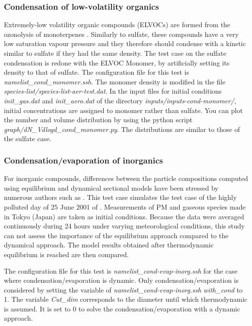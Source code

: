\documentclass[a4paper,11pt]{article}
\begin{document}
\subsubsection{Condensation of low-volatility organics}

Extremely-low volatility organic compounds (ELVOCs) are formed from the ozonolysis of monoterpenes \cite{chrit2017} .
Similarly to sulfate, these compounds have a very low saturation vapour pressure and they therefore should condense with a kinetic similar to sulfate if they had the same density.
The test case on the sulfate condensation is redone with the ELVOC Monomer, by artificially setting its density to that of sulfate.
The configuration file for this test is {\it{namelist\_cond\_monomer.ssh}}.
The monomer density is modified in the file {\it{species-list/species-list-aer-test.dat}}.
In the input files for initial conditions {\it{init\_gas.dat}} and {\it{init\_aero.dat}} of the directory {\it{inputs/inputs-cond-monomer/}}, initial concentrations are assigned to monomer rather than sulfate. You can plot the number and volume distribution by using the python script {\it{graph/dN\_Vdlogd\_cond\_monomer.py}}. 
The distributions are similar to those of the sulfate case.

\subsubsection{Condensation/evaporation of inorganics}
For inorganic compounds, differences between the particle compositions computed using equilibrium and dynamical sectional models have been stressed by numerous authors such as \cite{sartelet2006}. This test case simulates the test case of the highly polluted day of 25 June 2001 of \cite{sartelet2006} .
Measurements of PM and gaseous species made in Tokyo (Japan) are taken as initial conditions. Because the data were averaged continuously during 24 hours under varying meteorological conditions, this study can not assess the importance of the equilibrium approach compared to the dynamical approach. The model results obtained after thermodynamic equilibrium is reached are then compared.

The configuration file for this test is {\it{namelist\_cond-evap-inorg.ssh}} for the case where condensation/evaporation is dynamic. 
Only condensation/evaporation is considered by setting the variable of {\it{namelist\_cond-evap-inorg.ssh}} {\it{with\_cond}} to 1.
The variable {\it{Cut\_dim}} corresponds to the diameter until which thermodynamic is assumed. It is set to 0 to solve the condensation/evaporation with a dynamic approach. 
\end{document}
